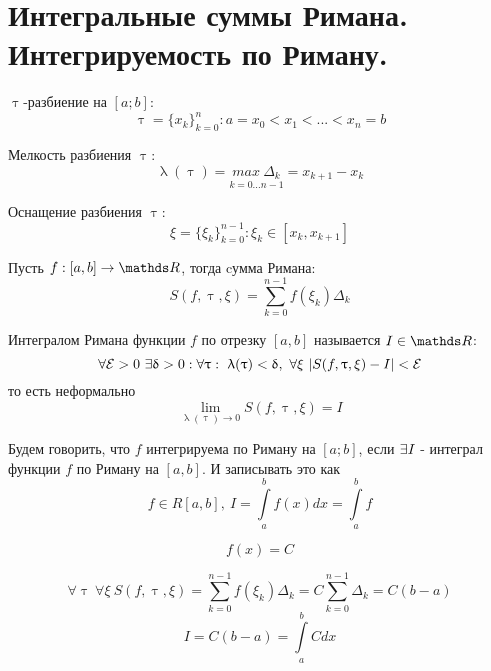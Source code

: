 \documentclass[matan]{subfiles}
\begin{document}
  \section{Интегральные суммы Римана. Интегрируемость по Риману.}
  \hypertarget{q1}{}

  \begin{definition}
      $\uptau$-разбиение на $[a;b]$: $$\uptau=\{x_k\}^n_{k=0}: a=x_0<x_1<...<x_n=b$$
  \end{definition}

  \begin{definition}
      Мелкость разбиения $\uptau$: $$\uplambda(\uptau)=\underset{k=0...n-1}{max\ \Delta_k} = x_{k+1}-x_k$$
  \end{definition}

  \begin{definition}
      Оснащение разбиения $\uptau$: $$\xi=\{\xi_k\}^{n-1}_{k=0}: \xi_k \in [x_k, x_{k+1}]$$
  \end{definition}

  \begin{definition}
       Пусть $f: [a, b] \rightarrow \R$, тогда cумма Римана: $$S(f, \uptau, \xi)=\sum\limits_{k=0}^{n-1} f(\xi_k) \Delta_k$$
  \end{definition}

  \begin{definition}
      Интегралом Римана функции $f$ по отрезку $[a, b]$ называется $I \in \R$: $$\forall \mathcal{E} > 0\ \exists \updelta > 0: \forall \uptau: \ \uplambda(\uptau) < \updelta,\ \forall \xi \ |S(f, \uptau, \xi) - I| < \mathcal{E}$$ то есть неформально $$\lim_{\uplambda(\uptau) \rightarrow 0} S(f, \uptau, \xi) = I$$
  \end{definition}

  \begin{definition}
      Будем говорить, что $f$ интегрируема по Риману на $[a;b]$, если $\exists I$ - интеграл функции $f$ по Риману  на $[a,b]$. И записывать это как $$f \in R[a,b],\ I=\int\limits_a^b f(x) dx = \int\limits_a^b f$$
  \end{definition}

  \begin{Example}
      \[f(x)=C\]
  \end{Example}
  \begin{Sol}
      $$\forall \uptau \ \forall \xi \ S(f, \uptau, \xi) = \sum\limits_{k=0}^{n-1} f(\xi_k) \Delta_k = C \sum\limits_{k=0}^{n-1} \Delta_k = C (b-a)$$
      $$ I = C(b-a) = \int\limits_a^b C dx$$
  \end{Sol}
\end{document}
